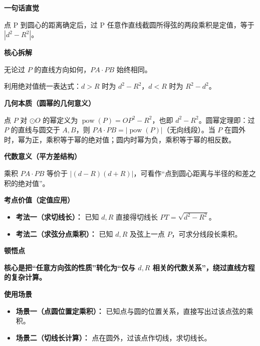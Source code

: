 \begin{explanationbox}
	\textbf{\textcolor{CExplanation}{一句话直觉}}

	点 P 到圆心的距离确定后，过 P 任意作直线截圆所得弦的两段乘积是定值，等于 $|d^{2}-R^{2}|$。

	\medskip
	\textbf{\textcolor{CExplanation}{核心拆解}}
	\begin{description}[style=nextline, leftmargin=2.8em, labelsep=0.5em, itemsep=0.45em]
		\item[\textbf{要点一（定值与方向无关）：}] 无论过 $P$ 的直线方向如何，$PA\cdot PB$ 始终相同。
		\item[\textbf{要点二（内外情形对称）：}] 利用绝对值统一表达式：$d>R$ 时为 $d^{2}-R^{2}$，$d<R$ 时为 $R^{2}-d^{2}$。
	\end{description}

	\medskip
	\textbf{\textcolor{CExplanation}{几何本质（圆幂的几何意义）}}

	点 $P$ 对 $\odot O$ 的幂定义为 $\operatorname{pow}(P)=OP^{2}-R^{2}$，也即 $d^{2}-R^{2}$。圆幂定理即：过 $P$ 的直线与圆交于 $A,B$，则 $PA\cdot PB = |\operatorname{pow}(P)|$（无向线段）。当 $P$ 在圆外时，幂为正，乘积等于幂的绝对值；圆内时幂为负，乘积等于幂的相反数。

	\medskip
	\textbf{\textcolor{CExplanation}{代数意义（平方差结构）}}

	乘积 $PA\cdot PB$ 等价于 $|(d-R)(d+R)|$，可看作“点到圆心距离与半径的和差之积的绝对值”。

	\medskip
	\textbf{\textcolor{CExplanation}{考点价值（定值应用）}}
	\begin{itemize}[leftmargin=*, itemsep=0.5em, topsep=0.4em]
		\item \textbf{考法一（求切线长）：} 已知 $d,R$ 直接得切线长 $PT=\sqrt{d^{2}-R^{2}}$。
		\item \textbf{考法二（求弦分点乘积）：} 已知 $d,R$ 及弦上一点 $P$，可求分线段长乘积。
	\end{itemize}

	\medskip
	\textbf{\textcolor{CExplanation}{顿悟点}}

	\textbf{核心是把“任意方向弦的性质”转化为“仅与 $d,R$ 相关的代数关系”，绕过直线方程的复杂计算。}

	\medskip
	\textbf{\textcolor{CExplanation}{使用场景}}
	\begin{itemize}[leftmargin=*, itemsep=0.5em, topsep=0.4em]
		\item \textbf{场景一（点圆位置定乘积）：} 已知点与圆的位置关系，直接写出过该点弦的乘积。
		\item \textbf{场景二（切线长计算）：} 点在圆外，过该点作切线，求切线长。
	\end{itemize}
\end{explanationbox}
